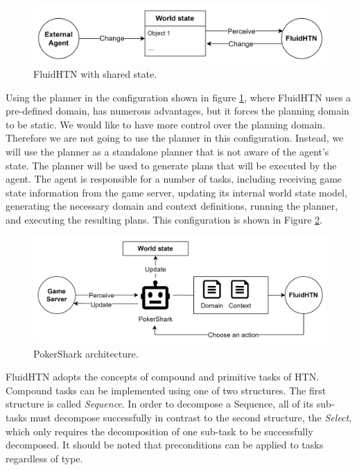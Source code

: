 \begin{figure}[h]
    \centering
    \includegraphics[width=\textwidth]{graphics/agent_3.png}
    \caption{FluidHTN with shared state.}
    \label{fig:agent}
\end{figure}

Using the planner in the configuration shown in figure \ref{fig:agent}, where FluidHTN uses a pre-defined domain, has numerous advantages, but it forces the planning domain to be static. We would like to have more control over the planning domain. Therefore we are not going to use the planner in this configuration. Instead, we will use the planner as a standalone planner that is not aware of the agent's state. The planner will be used to generate plans that will be executed by the agent. The agent is responsible for a number of tasks, including receiving game state information from the game server, updating its internal world state model, generating the necessary domain and context definitions, running the planner, and executing the resulting plans. This configuration is shown in Figure \ref{fig:PokerSharkArchitecture}.


\begin{figure}[h]
    \centering
    \includegraphics[width=\textwidth]{graphics/structure.png}
    \caption{PokerShark architecture.}
    \label{fig:PokerSharkArchitecture}
\end{figure}

FluidHTN adopts the concepts of compound and primitive tasks of HTN. Compound tasks can be implemented using one of two structures. The first structure is called \textit{Sequence}. In order to decompose a Sequence, all of its sub-tasks must decompose successfully in contrast to the second structure, the \textit{Select}, which only requires the decomposition of one sub-task to be successfully decomposed. It should be noted that preconditions can be applied to tasks regardless of type.


